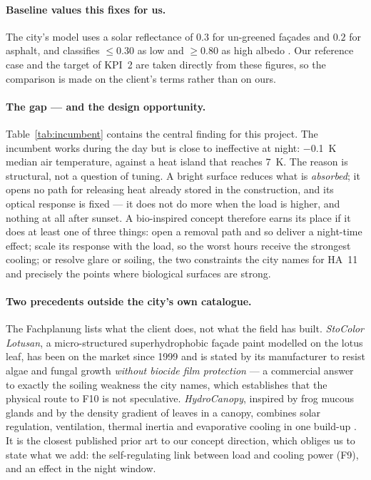 \paragraph{Baseline values this fixes for us.} The city's model uses a solar
reflectance of $0.3$ for un-greened façades and $0.2$ for asphalt, and
classifies $\leq 0.30$ as low and $\geq 0.80$ as high albedo
\parencite[114, 128--129]{stadtzuerich2020}. Our reference case and the target
of KPI~2 are taken directly from these figures, so the comparison is made on the
client's terms rather than on ours.

\paragraph{The gap --- and the design opportunity.} Table~\ref{tab:incumbent}
contains the central finding for this project. The incumbent works during the
day but is close to ineffective at night: \qty{-0.1}{\kelvin} median air
temperature, against a heat island that reaches \qty{7}{\kelvin}. The reason is
structural, not a question of tuning. A bright surface reduces what is
\emph{absorbed}; it opens no path for releasing heat already stored in the
construction, and its optical response is fixed --- it does not do more when the
load is higher, and nothing at all after sunset. A bio-inspired concept
therefore earns its place if it does at least one of three things: open a
removal path and so deliver a night-time effect; scale its response with the
load, so the worst hours receive the strongest cooling; or resolve glare or
soiling, the two constraints the city names for HA~11 and precisely the points
where biological surfaces are strong.

\paragraph{Two precedents outside the city's own catalogue.} The Fachplanung
lists what the client does, not what the field has built. \emph{StoColor
Lotusan}, a micro-structured superhydrophobic façade paint modelled on the lotus
leaf, has been on the market since 1999 and is stated by its manufacturer to
resist algae and fungal growth \emph{without biocide film protection}
\parencite{sto_lotusan} --- a commercial answer to exactly the soiling weakness
the city names, which establishes that the physical route to F10 is not
speculative. \emph{HydroCanopy}, inspired by frog mucous glands and by the
density gradient of leaves in a canopy, combines solar regulation, ventilation,
thermal inertia and evaporative cooling in one build-up
\parencite{asknature_hydrocanopy}. It is the closest published prior art to our
concept direction, which obliges us to state what we add: the self-regulating
link between load and cooling power (F9), and an effect in the night window.

